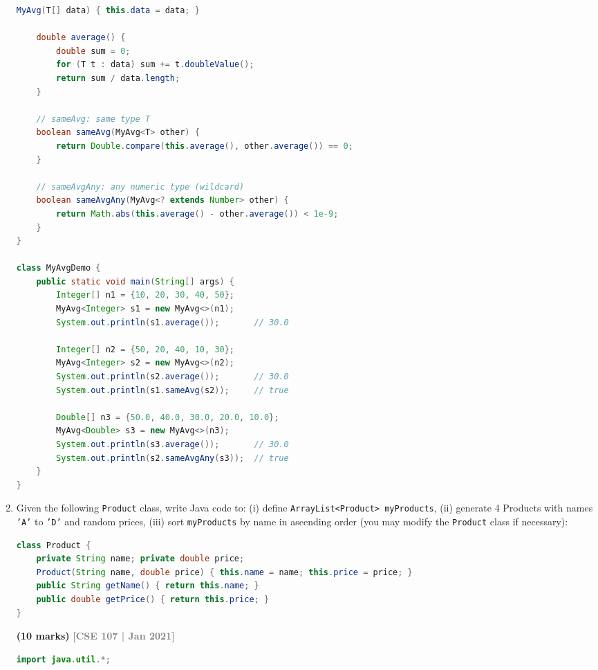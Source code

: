 \documentclass[12pt,a3paper]{article}
\newcommand{\yr}[1]{\hfill\textcolor{gray}{\small\textbf{[#1]}}}
\newcommand{\mk}[1]{\textcolor{orange!70!black}{\small\textbf{(#1 marks)}}}
\begin{document}
\begin{enumerate}
\begin{tcolorbox}[enhanced,breakable,ansbox,
  colback=cG!4,colframe=cG,boxrule=0.8pt,arc=5pt,
  title={\textbf{Answer --- MyAvg with sameAvg and sameAvgAny}},
  fonttitle=\bfseries\color{white},colbacktitle=cG]
\begin{lstlisting}[language=Java]
    MyAvg(T[] data) { this.data = data; }

    double average() {
        double sum = 0;
        for (T t : data) sum += t.doubleValue();
        return sum / data.length;
    }

    // sameAvg: same type T
    boolean sameAvg(MyAvg<T> other) {
        return Double.compare(this.average(), other.average()) == 0;
    }

    // sameAvgAny: any numeric type (wildcard)
    boolean sameAvgAny(MyAvg<? extends Number> other) {
        return Math.abs(this.average() - other.average()) < 1e-9;
    }
}

class MyAvgDemo {
    public static void main(String[] args) {
        Integer[] n1 = {10, 20, 30, 40, 50};
        MyAvg<Integer> s1 = new MyAvg<>(n1);
        System.out.println(s1.average());       // 30.0

        Integer[] n2 = {50, 20, 40, 10, 30};
        MyAvg<Integer> s2 = new MyAvg<>(n2);
        System.out.println(s2.average());       // 30.0
        System.out.println(s1.sameAvg(s2));     // true

        Double[] n3 = {50.0, 40.0, 30.0, 20.0, 10.0};
        MyAvg<Double> s3 = new MyAvg<>(n3);
        System.out.println(s3.average());       // 30.0
        System.out.println(s2.sameAvgAny(s3));  // true
    }
}
\end{lstlisting}
\end{tcolorbox}

\item Given the following \texttt{Product} class, write Java code to: (i) define \texttt{ArrayList<Product> myProducts}, (ii) generate 4 Products with names \texttt{'A'} to \texttt{'D'} and random prices, (iii) sort \texttt{myProducts} by name in ascending order (you may modify the \texttt{Product} class if necessary):
\begin{lstlisting}[language=Java]
class Product {
    private String name; private double price;
    Product(String name, double price) { this.name = name; this.price = price; }
    public String getName() { return this.name; }
    public double getPrice() { return this.price; }
}
\end{lstlisting}
\mk{10}
\yr{CSE 107 | Jan 2021}

\begin{tcolorbox}[enhanced,breakable,ansbox,
  colback=cG!4,colframe=cG,boxrule=0.8pt,arc=5pt,
  title={\textbf{Answer --- Product Sort by Name Ascending}},
  fonttitle=\bfseries\color{white},colbacktitle=cG]
\begin{lstlisting}[language=Java]
import java.util.*;


\end{lstlisting}
\end{tcolorbox}
\end{enumerate}
\end{document}
